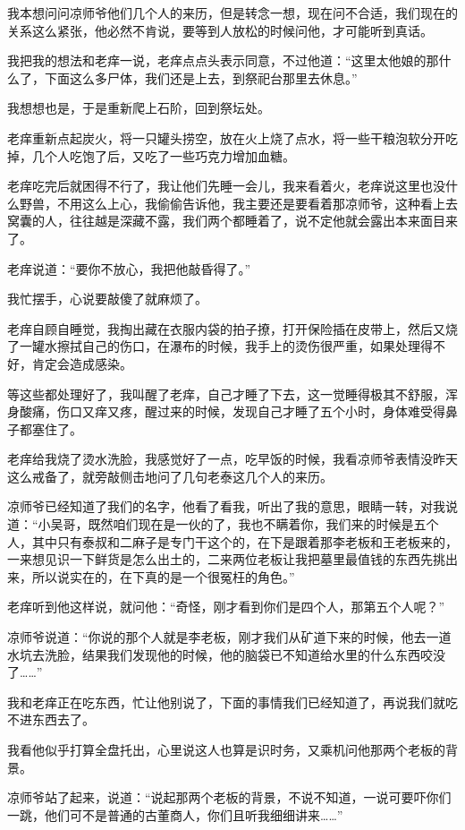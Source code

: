 我本想问问凉师爷他们几个人的来历，但是转念一想，现在问不合适，我们现在的关系这么紧张，他必然不肯说，要等到人放松的时候问他，才可能听到真话。

我把我的想法和老痒一说，老痒点点头表示同意，不过他道：“这里太他娘的那什么了，下面这么多尸体，我们还是上去，到祭祀台那里去休息。”

我想想也是，于是重新爬上石阶，回到祭坛处。

老痒重新点起炭火，将一只罐头捞空，放在火上烧了点水，将一些干粮泡软分开吃掉，几个人吃饱了后，又吃了一些巧克力增加血糖。

老痒吃完后就困得不行了，我让他们先睡一会儿，我来看着火，老痒说这里也没什么野兽，不用这么上心，我偷偷告诉他，我主要还是要看着那凉师爷，这种看上去窝囊的人，往往越是深藏不露，我们两个都睡着了，说不定他就会露出本来面目来了。

老痒说道：“要你不放心，我把他敲昏得了。”

我忙摆手，心说要敲傻了就麻烦了。

老痒自顾自睡觉，我掏出藏在衣服内袋的拍子撩，打开保险插在皮带上，然后又烧了一罐水擦拭自己的伤口，在瀑布的时候，我手上的烫伤很严重，如果处理得不好，肯定会造成感染。

等这些都处理好了，我叫醒了老痒，自己才睡了下去，这一觉睡得极其不舒服，浑身酸痛，伤口又痒又疼，醒过来的时候，发现自己才睡了五个小时，身体难受得鼻子都塞住了。

老痒给我烧了烫水洗脸，我感觉好了一点，吃早饭的时候，我看凉师爷表情没昨天这么戒备了，就旁敲侧击地问了几句老泰这几个人的来历。

凉师爷已经知道了我们的名字，他看了看我，听出了我的意思，眼睛一转，对我说道：“小吴哥，既然咱们现在是一伙的了，我也不瞒着你，我们来的时候是五个人，其中只有泰叔和二麻子是专门干这个的，在下是跟着那李老板和王老板来的，一来想见识一下鲜货是怎么出土的，二来两位老板让我把墓里最值钱的东西先挑出来，所以说实在的，在下真的是一个很冤枉的角色。”

老痒听到他这样说，就问他：“奇怪，刚才看到你们是四个人，那第五个人呢？”

凉师爷说道：“你说的那个人就是李老板，刚才我们从矿道下来的时候，他去一道水坑去洗脸，结果我们发现他的时候，他的脑袋已不知道给水里的什么东西咬没了……”

我和老痒正在吃东西，忙让他别说了，下面的事情我们已经知道了，再说我们就吃不进东西去了。

我看他似乎打算全盘托出，心里说这人也算是识时务，又乘机问他那两个老板的背景。

凉师爷站了起来，说道：“说起那两个老板的背景，不说不知道，一说可要吓你们一跳，他们可不是普通的古董商人，你们且听我细细讲来……”

